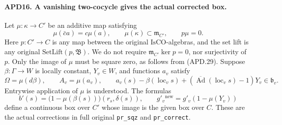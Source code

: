 \paragraph{APD16. A vanishing two-cocycle gives the actual corrected box.}
\label{claim:APD16}
Let \(\mu:\kappa\to C'\) be an additive map satisfying
\[
 \mu(\bar c a)=c\mu(a),\qquad
 \mu(\kappa)\subset\mathfrak m_{C'},\qquad p\mu=0.
                                                               \tag{APD.29}
\]
Here \(p:C'\to C\) is any map between the original
\(\mathrm{IsCO}\)-algebras, and the set lift is any original
\(\mathrm{SetLift}(p,\mathfrak B)\).  We do not require
\(\mathfrak m_{C'}\ker p=0\), nor surjectivity of \(p\).
Only the image of \(\mu\) must be square zero, as follows
from (APD.29).  Suppose \(\beta:\Gamma\to W\)
is locally constant, \(Y_v\in W\), and functions \(a_v\)
satisfy
\[
 \Omega=\mu(d\beta),\qquad A_v=\mu(a_v),\qquad
 a_v(s)-\beta(\operatorname{loc}_v s)
       +(\overline{\operatorname{Ad}}(\operatorname{loc}_v s)-1)Y_v
                                                        \in\mathfrak b_v.
                                                               \tag{APD.30}
\]
Entrywise application of \(\mu\) is understood.  The formulas
\[
 b'(s)=\bigl(1-\mu(\beta(s))\bigr)(r_s,\delta(s)),
 \qquad g'_v{}^{\mathrm{new}}=g'_v(1-\mu(Y_v))             \tag{APD.31}
\]
define a continuous box over \(C'\) whose image is the given box
over \(C\).  These are the actual corrections in full original
\texttt{pr\_sqz} and \texttt{pr\_correct}.


